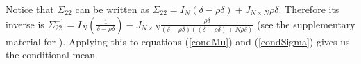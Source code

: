 \documentclass[11pt,twoside]{article}
\begin{document}

Notice that $\Sigma_{22}$ can be written as  $\Sigma_{22} = I_N (\delta-\rho\delta) + J_{N \times N} \rho\delta$. Therefore its inverse is $\Sigma_{22}^{-1} = I_N \left(\frac{1}{\delta-\rho\delta} \right) - J_{N \times N} \frac{\rho\delta}{(\delta-\rho\delta)((\delta-\rho\delta) + N \rho\delta)}$ (see the supplementary material for \cite{dobbin2005sample}). Applying this to equations (\ref{condMu}) and (\ref{condSigma}) gives us the conditional mean
%
\end{document}
